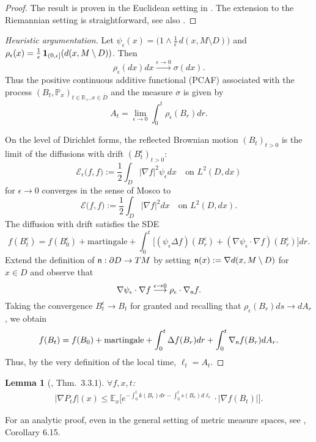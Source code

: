 \documentclass[a4paper,12pt]{article}
\theoremstyle{plain}
\newtheorem{lemma}[thm]{Lemma}
\def\R{{\mathbb R}}
\def\R{{\mathbb R}}%
\begin{document}
\begin{proof} The result is proven in the Euclidean setting in \cite{BH90}. The extension to the Riemannian setting is straightforward, see also  \cite{Ch93}.
\end{proof}
\begin{proof}[Heuristic argumentation] 
Let $\psi_\epsilon(x)=\Big(1\wedge \frac1\epsilon\,d(x,M\setminus D)\Big)$ and $\rho_\epsilon(x)=\frac1\epsilon\, {\bf 1}_{(0,\epsilon]}(d(x,M\setminus D))$. Then
$$\rho_\epsilon(dx)dx\stackrel{\epsilon\to0}\longrightarrow \sigma(dx).$$
Thus the positive continuous additive functional (PCAF) associated with the process $(B_t,\mathbb P_x)_{t\in\R_+, x\in \bar D}$ and the measure $\sigma$ is given by
$$A_t=\lim_{\epsilon\to 0}\int_0^t \rho_\epsilon(B_r)dr.$$

 On the level of Dirichlet forms, the reflected Brownian motion $(B_t)_{t>0}$ is the limit of the diffusions with drift $(B^\epsilon_t)_{t>0}$:
$$\mathcal E_\epsilon\big(f,f\big):=\frac12\int_{D} |\nabla f|^2 \psi_\epsilon dx\quad\text{on }L^2(D,   dx)$$
for $\epsilon\to0$ converges in the sense of Mosco to
$$\mathcal E\big(f,f\big):=\frac12\int_{D} |\nabla f|^2  dx\quad\text{on }L^2( D,  dx).$$
The diffusion with drift satisfies the SDE
$$f(B_t^\epsilon)=f(B^\epsilon_0)+\text{martingale} + \int_0^t\Big[(\psi_\epsilon\Delta f)(B^\epsilon_r)+(\nabla\psi_\epsilon\cdot \nabla f)(B^\epsilon_r)\Big]dr.$$
Extend the definition of ${\sf n}:\partial D\to TM$ by setting ${\sf n}(x):=\nabla d(x,M\setminus D)$ for $x\in D$ and 
observe that
 $$\nabla\psi_\epsilon\cdot \nabla f\stackrel{\epsilon\to0}\longrightarrow \rho_\epsilon \cdot \nabla_{\sf n}f.$$
 Taking the convergence $B^\epsilon_t\to B_t$ for granted  and recalling that $\rho_\epsilon(B_r)ds \to dA_r$,
we obtain
 $$f(B_t)=f(B_0)+\text{martingale} + \int_0^t\Delta f(B_r)dr+\int_0^t  \nabla_{\sf n}f(B_r)dA_r.$$
 Thus, by the very definition of the local time,  $\ell_t=A_t$.
 \end{proof}

\begin{lemma}[{\cite{Wang-Book}, Thm.~3.3.1}]  $\forall f, x,t$:
\begin{align}\label{wang}
\big| \nabla P_{t}f\big|(x)\le
\mathbb E_{x}\Big[ e^{-\int_0^{t}  k(B_{r})dr-\int_0^{t} s(B_r)d\ell_r}
\cdot \big|\nabla f(B_{t})\big|\Big].
\end{align}
\end{lemma}
For an analytic proof, even in the general setting of metric measure spaces, see \cite{St-distr}, Corollary 6.15.
\end{document}
